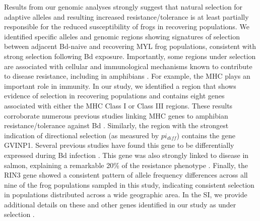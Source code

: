 \documentclass[9pt,twocolumn,twoside,lineno]{pnas-new}
\begin{document}
Results from our genomic analyses strongly suggest that natural
selection for adaptive alleles and resulting increased
resistance/tolerance is at least partially responsible for the reduced
susceptibility of frogs in recovering populations. We identified
specific alleles and genomic regions showing signatures of selection
between adjacent Bd-naive and recovering MYL frog populations,
consistent with strong selection following Bd exposure. Importantly,
some regions under selection are associated with cellular and
immunological mechanisms known to contribute to disease resistance,
including in amphibians \citep{zamudio2020}. For example, the MHC plays
an important role in immunity. In our study, we identified a region that
shows evidence of selection in recovering populations and contains eight
genes associated with either the MHC Class I or Class III regions. These
results corroborate numerous previous studies linking MHC genes to
amphibian resistance/tolerance against Bd
\citep[e.g.,][]{savage2011, bataille2015}. Similarly, the region with
the strongest indication of directional selection (as measured by
\(pi_{diff}\)) contains the gene GVINP1. Several previous studies have
found this gene to be differentially expressed during Bd infection
\citep[e.g.,][]{grogan2018, ellison2014}. This gene was also strongly
linked to disease in salmon, explaining a remarkable 20\% of the
resistance phenotype \citep{robledo2020, robledo2018}. Finally, the RIN3
gene showed a consistent pattern of allele frequency differences across
all nine of the frog populations sampled in this study, indicating
consistent selection in populations distributed across a wide geographic
area. In the SI, we provide additional details on these and other genes
identified in our study as under selection .
\end{document}
